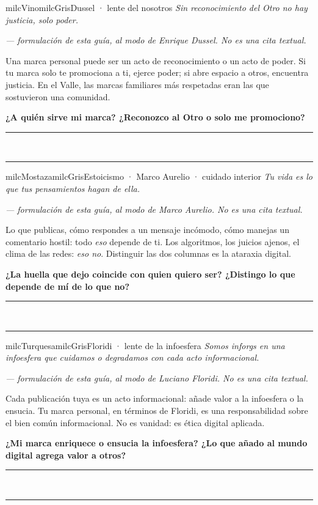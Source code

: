 \documentclass[11pt,letterpaper]{article}
\newcommand{\linead}[1]{\noindent\color{milcLinea}\rule{#1}{0.5pt}\color{milcNegro}}
\begin{document}
\begin{softbox}{milcVino}{milcGris}{Dussel · lente del nosotros}
\textit{Sin reconocimiento del Otro no hay justicia, solo poder.}

{\footnotesize\itshape\color{milcNegro!70}--- formulación de esta guía, al modo de Enrique Dussel. No es una cita textual.}

Una marca personal puede ser un acto de reconocimiento o un acto de poder. Si tu marca solo te promociona a ti, ejerce poder; si abre espacio a otros, encuentra justicia. En el Valle, las marcas familiares más respetadas eran las que sostuvieron una comunidad.

\textbf{¿A quién sirve mi marca? ¿Reconozco al Otro o solo me promociono?}
\end{softbox}
\linead{\linewidth}\\[1mm]
\linead{\linewidth}

\begin{softbox}{milcMostaza}{milcGris}{Estoicismo · Marco Aurelio · cuidado interior}
\textit{Tu vida es lo que tus pensamientos hagan de ella.}

{\footnotesize\itshape\color{milcNegro!70}--- formulación de esta guía, al modo de Marco Aurelio. No es una cita textual.}

Lo que publicas, cómo respondes a un mensaje incómodo, cómo manejas un comentario hostil: todo \emph{eso} depende de ti. Los algoritmos, los juicios ajenos, el clima de las redes: \emph{eso no}. Distinguir las dos columnas es la ataraxia digital.

\textbf{¿La huella que dejo coincide con quien quiero ser? ¿Distingo lo que depende de mí de lo que no?}
\end{softbox}
\linead{\linewidth}\\[1mm]
\linead{\linewidth}

\begin{softbox}{milcTurquesa}{milcGris}{Floridi · lente de la infoesfera}
\textit{Somos inforgs en una infoesfera que cuidamos o degradamos con cada acto informacional.}

{\footnotesize\itshape\color{milcNegro!70}--- formulación de esta guía, al modo de Luciano Floridi. No es una cita textual.}

Cada publicación tuya es un acto informacional: añade valor a la infoesfera o la ensucia. Tu marca personal, en términos de Floridi, es una responsabilidad sobre el bien común informacional. No es vanidad: es ética digital aplicada.

\textbf{¿Mi marca enriquece o ensucia la infoesfera? ¿Lo que añado al mundo digital agrega valor a otros?}
\end{softbox}
\linead{\linewidth}\\[1mm]
\linead{\linewidth}
\end{document}
